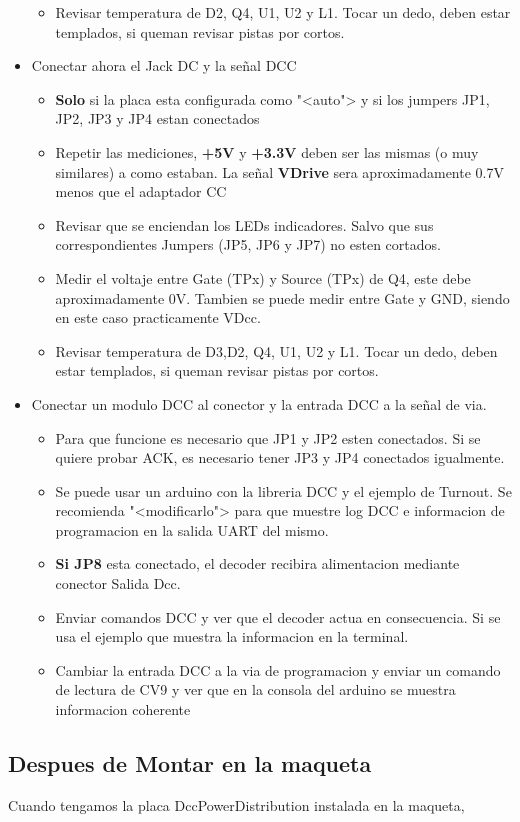 \begin{itemize}
\begin{itemize}
\item Revisar temperatura de D2, Q4, U1, U2 y L1. Tocar un dedo, deben estar templados, si queman revisar pistas por cortos.

	\end{itemize}
\item Conectar ahora el Jack DC y la señal DCC
	\begin{itemize}
		\item \textbf{Solo} si la placa esta configurada como "<auto"> y si los jumpers JP1, JP2, JP3 y JP4 estan conectados

\item Repetir las mediciones, \textbf{+5V} y \textbf{+3.3V} deben ser las mismas (o muy similares) a como estaban. La señal \textbf{VDrive} sera aproximadamente 0.7V menos que el adaptador CC

\item Revisar que se enciendan los LEDs indicadores. Salvo que sus correspondientes Jumpers (JP5, JP6 y JP7) no esten cortados.
\item Medir el voltaje entre Gate (TPx) y Source (TPx) de Q4, este debe aproximadamente 0V. Tambien se puede medir entre Gate y GND, siendo en este caso practicamente VDcc.

\item Revisar temperatura de D3,D2, Q4, U1, U2 y L1. Tocar un dedo, deben estar templados, si queman revisar pistas por cortos.

	\end{itemize}

\item Conectar un modulo DCC al conector y la entrada DCC a la señal de via.
\begin{itemize}
\item  Para que funcione es necesario que JP1 y JP2 esten conectados. Si se quiere probar ACK, es necesario tener JP3 y JP4 conectados igualmente.
\item Se puede usar un arduino con la libreria DCC y el ejemplo de Turnout. Se recomienda "<modificarlo"> para que muestre log DCC e informacion de programacion en la salida UART del mismo.
\item \textbf{Si JP8} esta conectado, el decoder recibira alimentacion mediante conector Salida Dcc.
\item Enviar comandos DCC y ver que el decoder actua en consecuencia. Si se usa el ejemplo que muestra la informacion en la terminal.
\item Cambiar la entrada DCC a la via de programacion y enviar un comando de lectura de CV9 y ver que en la consola del arduino se muestra informacion coherente 

\end{itemize}
\end{itemize}
\subsection{Despues de Montar en la maqueta}
Cuando tengamos la placa DccPowerDistribution instalada en la maqueta, 

